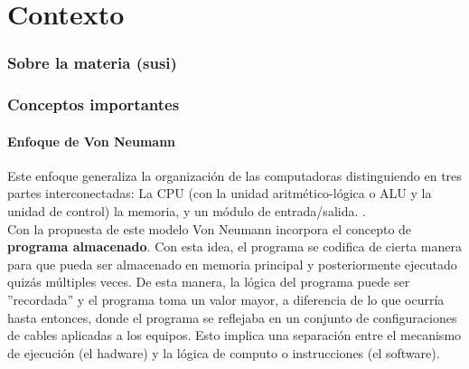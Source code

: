\part{Contexto}
\section{Sobre la materia \orga (susi)}
\section{Conceptos importantes}

\subsection{Enfoque de Von Neumann}
Este enfoque generaliza la organización de las computadoras distinguiendo en tres partes interconectadas: La CPU (con la unidad aritmético-lógica o ALU y la unidad de control) la memoria, y un módulo de entrada/salida. . \\

Con la propuesta de este modelo Von Neumann incorpora el concepto de \textbf{programa almacenado}. 
{Con esta idea, el programa se codifica de cierta manera para que pueda ser almacenado en memoria principal y posteriormente ejecutado quizás múltiples veces. De esta manera, la lógica del programa puede ser ''recordada'' y el programa toma un valor mayor, a diferencia de lo que ocurría hasta entonces, donde el programa se reflejaba en un conjunto de configuraciones de cables aplicadas a los equipos. Esto implica una separación entre el mecanismo de ejecución (el hadware) y la lógica de computo o instrucciones (el software).}


